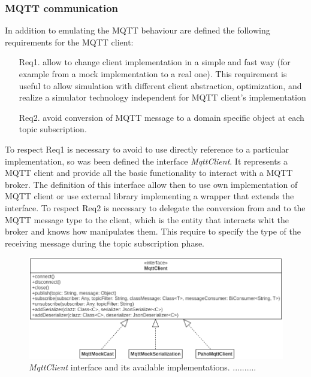 \subsubsection{MQTT communication}
In addition to emulating the MQTT behaviour are defined the following requirements for the MQTT client:
\begin{enumerate}
    \item[Req1.] allow to change client implementation in a simple and fast way (for example from a mock implementation to a real one). 
    This requirement is useful to allow simulation with different client abstraction, optimization, and realize a simulator technology independent for MQTT client's implementation
    \item[Req2.] avoid conversion of MQTT message to a domain specific object at each topic \mbox{subscription}.
\end{enumerate}
To respect Req1 is necessary to avoid to use directly reference to a particular implementation, so was been defined the interface \mbox{\textit{MqttClient}}.
It represents a MQTT client and provide all the basic functionality to interact with a MQTT broker. 
The definition of this interface allow then to use own implementation of MQTT client or use external library implementing a wrapper that extends the interface.
To respect Req2 is necessary to delegate the conversion from and to the MQTT message type to the client, which is the entity that interacts whit the broker and knows how manipulates them. This require to specify the type of the receiving message during the topic subscription phase.
\begin{figure}[h]
    \centering
    \includegraphics[width=\textwidth]{figures/mqttClient.png}
    \caption{\textit{MqttClient} interface and its available implementations.\-
    ..........}
    \label{fig:mqtt}
\end{figure}

